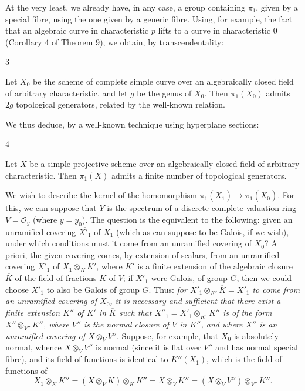   At the very least, we already have, in any case, a group containing \(\pi _1\), given by a special fibre, using the one given by a generic fibre.
  Using, for example, the fact that an algebraic curve in characteristic \(p\) lifts to a curve in characteristic \(0\) (\hyperref[fga2-theorem-9-corollary-4]{Corollary 4 of Theorem 9}), we obtain, by transcendentality:\begin{corollary}{3}\label{fga2-theorem-12-corollary-3}\skipsinglepar\par{}Let \(X_0\) be the scheme of complete simple curve over an algebraically closed field of arbitrary characteristic, and let \(g\) be the genus of \(X_0\).
    Then \(\pi _1(X_0)\) admits \(2g\) topological generators, related by the well-known relation.\end{corollary}\par{}We thus deduce, by a well-known technique using hyperplane sections:\begin{corollary}{4}\label{fga2-theorem-12-corollary-4}\skipsinglepar\par{}Let \(X\) be a simple projective scheme over an algebraically closed field of arbitrary characteristic.
    Then \(\pi _1(X)\) admits a finite number of topological generators.\end{corollary}\par{}We wish to describe the kernel of the homomorphism \(\pi _1(\overline {X_1})\to \pi _1(\overline {X_0})\).
  For this, we can suppose that \(Y\) is the spectrum of a discrete complete valuation ring \(V=\mathcal {O}_y\) (where \(y=y_0\)).
  The question is the equivalent to the following:
  given an unramified covering \(\overline {X'_1}\) of \(\overline {X_1}\) (which as can suppose to be Galois, if we wish), under which conditions must it come from an unramified covering of \(X_0\)?
  A priori, the given covering comes, by extension of scalars, from an unramified covering \(X'_1\) of \(X_1\otimes _KK'\), where \(K'\) is a finite extension of the algebraic closure \(\overline {K}\) of the field of fractions \(K\) of \(V\);
  if \(X'_1\) were Galois, of group \(G\), then we could choose \(X'_1\) to also be Galois of group \(G\).
  Thus: \emph{for \(X'_1\otimes _{K'}\overline {K}=\overline {X'_1}\) to come from an unramified covering of \(X_0\), it is necessary and sufficient that there exist a finite extension \(K''\) of \(K'\) in \(\overline {K}\) such that \(X''_1=X'_1\otimes _{K'}K''\) is of the form \(X''\otimes _{V''}K''\), where \(V''\) is the normal closure of \(V\) in \(K''\), and where \(X''\) is an unramified covering of \(X\otimes _V V''\)}.
  Suppose, for example, that \(X_0\) is absolutely normal, whence \(X\otimes _V V''\) is normal (since it is flat over \(V''\) and has normal special fibre), and its field of functions is identical to \(K''(X_1)\), which is the field of functions of
  \[     X_1\otimes _K K''     = (X\otimes _VK)\otimes _KK''     = X\otimes _VK''     = (X\otimes _VV'')\otimes _{V''}K''.   \]
  
